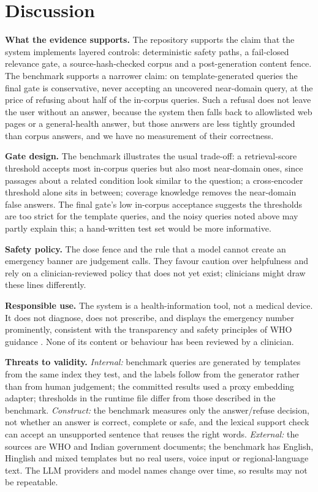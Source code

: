 \documentclass[10pt,a4paper]{article}
\begin{document}
\section{Discussion}
\textbf{What the evidence supports.} The repository supports the claim that the system implements layered controls: deterministic safety paths, a fail-closed relevance gate, a source-hash-checked corpus and a post-generation content fence. The benchmark supports a narrower claim: on template-generated queries the final gate is conservative, never accepting an uncovered near-domain query, at the price of refusing about half of the in-corpus queries. Such a refusal does not leave the user without an answer, because the system then falls back to allowlisted web pages or a general-health answer, but those answers are less tightly grounded than corpus answers, and we have no measurement of their correctness.

\textbf{Gate design.} The benchmark illustrates the usual trade-off: a retrieval-score threshold accepts most in-corpus queries but also most near-domain ones, since passages about a related condition look similar to the question; a cross-encoder threshold alone sits in between; coverage knowledge removes the near-domain false answers. The final gate's low in-corpus acceptance suggests the thresholds are too strict for the template queries, and the noisy queries noted above may partly explain this; a hand-written test set would be more informative.

\textbf{Safety policy.} The dose fence and the rule that a model cannot create an emergency banner are judgement calls. They favour caution over helpfulness and rely on a clinician-reviewed policy that does not yet exist; clinicians might draw these lines differently.

\textbf{Responsible use.} The system is a health-information tool, not a medical device. It does not diagnose, does not prescribe, and displays the emergency number prominently, consistent with the transparency and safety principles of WHO guidance \citep{who2021}. None of its content or behaviour has been reviewed by a clinician.

\textbf{Threats to validity.} \emph{Internal:} benchmark queries are generated by templates from the same index they test, and the labels follow from the generator rather than from human judgement; the committed results used a proxy embedding adapter; thresholds in the runtime file differ from those described in the benchmark. \emph{Construct:} the benchmark measures only the answer/refuse decision, not whether an answer is correct, complete or safe, and the lexical support check can accept an unsupported sentence that reuses the right words. \emph{External:} the sources are WHO and Indian government documents; the benchmark has English, Hinglish and mixed templates but no real users, voice input or regional-language text. The LLM providers and model names change over time, so results may not be repeatable.
\end{document}
